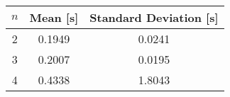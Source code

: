 \begin {tabular}{c|c|c}
$n$ & Mean [s] & Standard Deviation [s]
\\\hline
2 &  0.1949 &  0.0241\\
3 &  0.2007 &  0.0195\\
4 &  0.4338 &  1.8043\\
\end{tabular}
